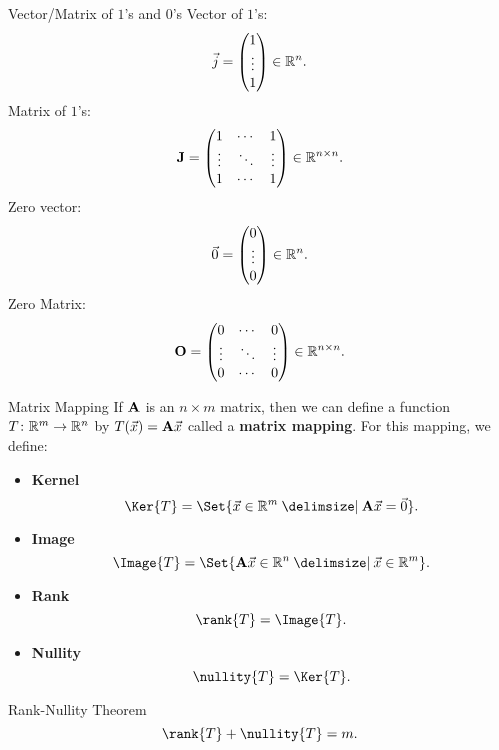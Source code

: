 \begin{Definition}{Vector/Matrix of $1$'s and $ 0 $'s}{}
    Vector of $ 1 $'s:
    \[ \vec{j}=\begin{pmatrix}
            1      \\
            \vdots \\
            1
        \end{pmatrix}\in\mathbb{R}^n. \]
    Matrix of $ 1 $'s:
    \[ \mathbf{J}=\begin{pmatrix}
            1      & \cdots & 1      \\
            \vdots & \ddots & \vdots \\
            1      & \cdots & 1
        \end{pmatrix}\in\mathbb{R}^{n\times n}. \]
    Zero vector:
    \[ \vec{0}=\begin{pmatrix}
            0      \\
            \vdots \\
            0
        \end{pmatrix}\in\mathbb{R}^n. \]
    Zero Matrix:
    \[ \mathbf{O}=\begin{pmatrix}
            0      & \cdots & 0      \\
            \vdots & \ddots & \vdots \\
            0      & \cdots & 0
        \end{pmatrix}\in\mathbb{R}^{n\times n}. \]
\end{Definition}
\begin{Definition}{Matrix Mapping}{}
    If $ \mathbf{A} $ is an $ n\times m $ matrix, then we can define a function $ T\colon \mathbb{R}^m\to\mathbb{R}^n $
    by $ T(\vec{x})=\mathbf{A}\vec{x} $ called a \textbf{matrix mapping}. For this mapping, we define:
    \begin{itemize}
        \item \textbf{Kernel}
              \[ \Ker{T}=\Set{\Vector{x}\in\R^m\given \Matrix{A}\Vector{x}=\Vector{0}}. \]
        \item \textbf{Image}
              \[ \Image{T}=\Set{\Matrix{A}\Vector{x}\in\R^n\given \Vector{x}\in\R^m}. \]
        \item \textbf{Rank}
              \[ \rank{T}=\dim{\Image{T}}. \]
        \item \textbf{Nullity}
              \[ \nullity{T}=\dim{\Ker{T}}. \]
    \end{itemize}
\end{Definition}
\begin{Remark}{Rank-Nullity Theorem}{}
    \[ \rank{T}+\nullity{T}=m. \]
\end{Remark}
